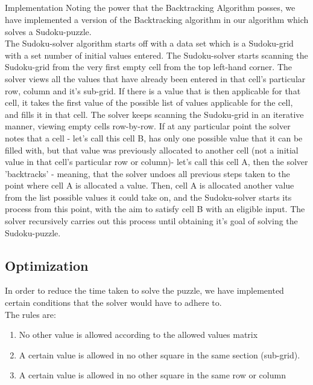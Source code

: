 \documentclass[12pt]{article}
\begin{document}
\subsection{}{Implementation}
Noting the power that the Backtracking Algorithm posses, we have implemented a version of the Backtracking algorithm in our algorithm which solves a Sudoku-puzzle.\\
The Sudoku-solver algorithm starts off with a data set which is a Sudoku-grid with a set number of initial values entered.%
The Sudoku-solver starts scanning the Sudoku-grid from the very first empty cell from the top left-hand corner. The solver views all the values that have already been entered in that cell's particular row, column and it's sub-grid. If there is a value that is then applicable for that cell, it takes the first value of the possible list of values applicable for the cell, and fills it in that cell. The solver keeps scanning the Sudoku-grid in an iterative manner, viewing empty cells row-by-row. If at any particular point the solver notes that a cell - let's call this cell B,  has only one possible value that it can be filled with, but that value was previously allocated to another cell %
(not a initial value in that cell's particular row or column)- let's call this cell A, then the solver 'backtracks' - meaning, that the solver undoes all previous steps taken to the point where cell A is allocated a value. Then, cell A is allocated another value from the list possible values it could take on, and the Sudoku-solver starts its process from this point, with the aim to satisfy cell B with an eligible input. The solver recursively carries out this process until obtaining it's goal of solving the Sudoku-puzzle.  
\subsection{Optimization}
In order to reduce the time taken to solve the puzzle, we have implemented certain conditions that the solver would have to adhere to. \\
The rules are: 
\begin{enumerate}
\item No other value is allowed according to the allowed values matrix
\item A certain value is allowed in no other square in the same section (sub-grid). 
\item A certain value is allowed in no other square in the same row or column
\end{enumerate}
\end{document}
